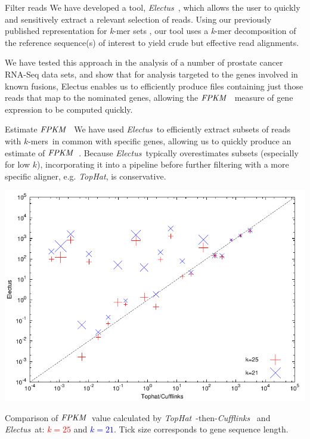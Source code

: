 \documentclass[a0paper,portrait]{baposter}
\newcommand{\kmers}{$k$-mers\ }
\newcommand{\fpkm}{\ensuremath{\hbox{\textit{FPKM}}}\ }
\newcommand{\Tophat}{\textit{TopHat}\ }
\newcommand{\Cufflinks}{\textit{Cufflinks}\ }
\newcommand{\Electus}{\textit{Electus}\ }
\begin{document}
\begin{poster}
\begin{posterbox}[name=filtering,column=0,below=problem]{Filter reads}
We have developed a tool, \Electus, which allows the user to quickly and sensitively extract a relevant selection of reads. Using our previously published representation for \textit{k}-mer sets \cite{ConwayBromage2011}, our tool uses a \textit{k}-mer decomposition of the reference sequence(s) of interest to yield crude but effective read alignments.

We have tested this approach in the analysis of a number of prostate cancer RNA-Seq data sets,
and show that for analysis targeted to the genes involved in known fusions,
Electus enables us to efficiently produce files containing just those reads that map to the nominated genes, allowing the \fpkm \cite{trapnell2010} measure of gene expression to be computed quickly.
\end{posterbox}

\begin{posterbox}[name=fpkm,column=0,below=filtering]{Estimate \fpkm}
We have used \Electus to efficiently extract subsets of reads with \kmers in common with specific genes, 
allowing us to quickly produce an estimate of \fpkm.
Because \Electus typically overestimates subsets (especially for low $k$), incorporating it into a pipeline before further filtering with a more specific aligner, e.g. \textit{TopHat}, is conservative.

\vspace{1.0em}
\includegraphics[width=\linewidth]{fpkm-vs_cuff}
\begin{center}
\footnotesize
Comparison of \fpkm value calculated by \Tophat \cite{tophat}-then-\Cufflinks \cite{cufflinks} and \Electus at: \textcolor{red}{$k = 25$} and \textcolor{blue}{$k = 21$}.
Tick size corresponds to gene sequence length.
\end{center}


\end{posterbox}
\end{poster}
\end{document}
